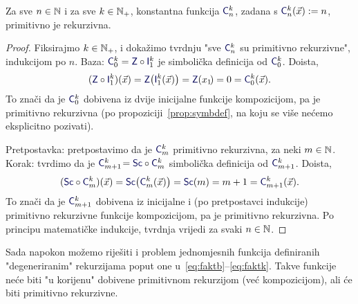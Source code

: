 \begin{propozicija}[{name=[primitivna rekurzivnost konstantnih funkcija]}]\label{prop:konst}
Za sve $n\in{\mathbb N}$ i za sve $k\in{\mathbb N}_+$, konstantna funkcija $\f C_n^k$, zadana s $\f C_n^k(\vec x):=n$, primitivno je rekurzivna.
\end{propozicija}
\begin{proof}
Fiksirajmo $k\in{\mathbb N}_+$, i dokažimo tvrdnju "sve $\f C_n^k$ su primitivno rekurzivne", indukcijom po $n$. Baza: $\f C_0^k=\f Z\circ\f I_1^k$ je simbolička definicija od $\f C_0^k$. Doista,
\begin{equation}
    (\f Z\circ\f I_1^k)(\vec x)=\f Z\bigl(\f I_1^k(\vec x)\bigr)=\f Z(x_1\!)=0=\f C_0^k(\vec x)\text.
\end{equation}
To znači da je $\f C_0^k$ dobivena iz dvije inicijalne funkcije kompozicijom, pa je primitivno rekurzivna (po propoziciji~\ref{prop:symbdef}, na koju se više nećemo eksplicitno pozivati).

Pretpostavka: pretpostavimo da je $\f C_m^k$ primitivno rekurzivna, za neki $m\in{\mathbb N}$. 
Korak: tvrdimo da je $\f C_{m+1}^k\!=\f{Sc}\circ\f C_m^k$ simbolička definicija od $\f C_{m+1}^k$. Doista,
\begin{equation}
    (\f{Sc}\circ\f C_m^k)(\vec x)=\f{Sc}\bigl(\f C_m^k(\vec x)\bigr)=\f{Sc}(m)=m+1=\f C_{m+1}^k(\vec x)\text.
\end{equation}
To znači da je $\f C_{m+1}^k$ dobivena iz inicijalne i (po pretpostavci indukcije) primitivno rekurzivne funkcije kompozicijom, pa je primitivno rekurzivna. Po principu matematičke indukcije, tvrdnja vrijedi za svaki $n\in{\mathbb N}$.
\end{proof}

Sada napokon možemo riješiti i problem jednomjesnih funkcija definiranih "degeneriranim" rekurzijama poput one u~\eqref{eq:faktb}--\eqref{eq:faktk}. Takve funkcije neće biti "u korijenu" dobivene primitivnom rekurzijom (već kompozicijom), ali će biti primitivno rekurzivne.

